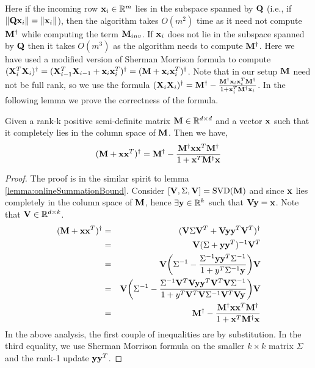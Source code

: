Here if the incoming row $\mathbf{x}_{i} \in \mathbb{R}^{m}$ lies in the subspace spanned by $\mathbf{Q}$ (i.e., if $\|\mathbf{Q}\mathbf{x}_{i}\|=\|\mathbf{x}_{i}\|$), then the algorithm takes $O(m^{2})$ time as it need not compute $\mathbf{M}^{\dagger}$ while computing the term $\mathbf{M}_{inv}$. If $\mathbf{x}_{i}$ does not lie in the subspace spanned by $\mathbf{Q}$ then it takes $O(m^{3})$ as the algorithm needs to compute $\mathbf{M}^{\dagger}$. Here we have used a modified version of Sherman Morrison formula to compute $(\mathbf{X}_{i}^{T}\mathbf{X}_{i})^{\dagger} = (\mathbf{X}_{i-1}^{T}\mathbf{X}_{i-1}+\mathbf{x}_{i}\mathbf{x}_{i}^{T})^{\dagger} = (\mathbf{M}+\mathbf{x}_{i}\mathbf{x}_{i}^{T})^{\dagger}$. Note that in our setup $\mathbf{M}$ need not be full rank, so we use the formula $(\mathbf{X}_{i}\mathbf{X}_{i})^{\dagger} = \mathbf{M}^{\dagger} - \frac{\mathbf{M}^{\dagger}\mathbf{x}_{i}\mathbf{x}_{i}^{T}\mathbf{M}^{\dagger}}{1+\mathbf{x}_{i}^{T}\mathbf{M}^{\dagger}\mathbf{x}_{i}}$. In the following lemma we prove the correctness of the formula.
\begin{lemma}{\label{lemma:modified-SM}}
 Given a rank-k positive semi-definite matrix $\mathbf{M} \in \mathbb{R}^{d \times d}$ and a vector $\mathbf{x}$ such that it completely lies in the column space of $\mathbf{M}$. Then we have,
 \begin{equation*}
  (\mathbf{M} + \mathbf{x}\mathbf{x}^{T})^{\dagger} = \mathbf{M}^{\dagger} - \frac{\mathbf{M}^{\dagger}\mathbf{x}\mathbf{x}^{T}\mathbf{M}^{\dagger}}{1+\mathbf{x}^{T}\mathbf{M}^{\dagger}\mathbf{x}}
 \end{equation*}
\end{lemma}
\begin{proof}
 The proof is in the similar spirit to lemma \ref{lemma:onlineSummationBound}. Consider $[\mathbf{V},\Sigma,\mathbf{V}] = \mbox{SVD}(\mathbf{M})$ and since $\mathbf{x}$ lies completely in the column space of $\mathbf{M}$, hence $\exists \mathbf{y} \in \mathbb{R}^{k}$ such that $\mathbf{V}\mathbf{y} = \mathbf{x}$. Note that $\mathbf{V} \in \mathbb{R}^{d \times k}$.
 \begin{eqnarray*}
  (\mathbf{M} + \mathbf{x}\mathbf{x}^{T})^{\dagger} &=& (\mathbf{V}\Sigma\mathbf{V}^{T}+\mathbf{V}\mathbf{y}\mathbf{y}^{T}\mathbf{V}^{T})^{\dagger} \\
  &=& \mathbf{V}(\Sigma+\mathbf{y}\mathbf{y}^{T})^{-1}\mathbf{V}^{T} \\
  &=& \mathbf{V}\bigg(\Sigma^{-1} - \frac{\Sigma^{-1}\mathbf{y}\mathbf{y}^{T}\Sigma^{-1}}{1+y^{T}\Sigma^{-1}\mathbf{y}}\bigg)\mathbf{V} \\
  &=& \mathbf{V}\bigg(\Sigma^{-1}-\frac{\Sigma^{-1}\mathbf{V}^{T}\mathbf{V}\mathbf{y}\mathbf{y}^{T}\mathbf{V}^{T}\mathbf{V}\Sigma^{-1}}{1+y^{T}\mathbf{V}^{T}\mathbf{V}\Sigma^{-1}\mathbf{V}^{T}\mathbf{V}\mathbf{y}}\bigg)\mathbf{V}\\
  &=& \mathbf{M}^{\dagger} - \frac{\mathbf{M}^{\dagger}\mathbf{x}\mathbf{x}^{T}\mathbf{M}^{\dagger}}{1+\mathbf{x}^{T}\mathbf{M}^{\dagger}\mathbf{x}}
 \end{eqnarray*}
 In the above analysis, the first couple of inequalities are by substitution. In the third equality, we use Sherman Morrison formula on the smaller $k \times k$ matrix $\Sigma$ and the rank-1 update $\mathbf{y}\mathbf{y}^{T}$.
\end{proof}
% 
